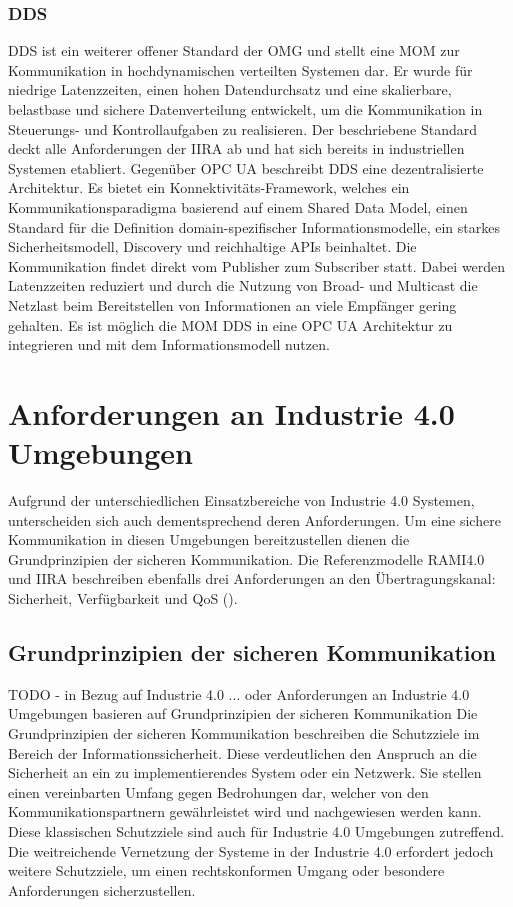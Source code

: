 \subsubsection{\ac{DDS}}
\ac{DDS} ist ein weiterer offener Standard der \ac{OMG} und stellt eine \ac{MOM} zur Kommunikation in hochdynamischen verteilten Systemen dar. Er wurde für niedrige Latenzzeiten, einen hohen Datendurchsatz und eine skalierbare, belastbase und sichere Datenverteilung entwickelt, um die Kommunikation in Steuerungs- und Kontrollaufgaben zu realisieren. Der beschriebene Standard deckt alle Anforderungen der \ac{IIRA} ab und hat sich bereits in industriellen Systemen etabliert. Gegenüber \ac{OPC UA} beschreibt \ac{DDS} eine dezentralisierte Architektur. Es bietet ein Konnektivitäts-Framework, welches ein Kommunikationsparadigma basierend auf einem Shared Data Model, einen Standard für die Definition domain-spezifischer Informationsmodelle, ein starkes Sicherheitsmodell, Discovery und reichhal­tige APIs beinhaltet. Die Kommunikation findet direkt vom Publisher zum Subscriber statt. Dabei werden Latenzzeiten reduziert und durch die Nutzung von Broad- und Multicast die Netzlast beim Bereitstellen von Informationen an viele Empfänger gering gehalten. Es ist möglich die \ac{MOM} \ac{DDS} in eine \ac{OPC UA} Architektur zu integrieren und mit dem Informationsmodell nutzen.

\section{Anforderungen an Industrie 4.0 Umgebungen}
Aufgrund der unterschiedlichen Einsatzbereiche von Industrie 4.0 Systemen, unterscheiden sich auch dementsprechend deren Anforderungen. Um eine sichere Kommunikation in diesen Umgebungen bereitzustellen dienen die Grundprinzipien der sicheren Kommunikation. Die Referenzmodelle \ac{RAMI4.0} und \ac{IIRA} beschreiben ebenfalls drei Anforderungen an den Übertragungskanal: Sicherheit, Verfügbarkeit und \ac{QoS} (\cite{BMWiNeCon2016}).

\subsection{Grundprinzipien der sicheren Kommunikation}
\label{Grundlagen:Grundprinzipien der sicheren Kommunikation}
TODO - in Bezug auf Industrie 4.0 ... oder Anforderungen an Industrie 4.0 Umgebungen basieren auf Grundprinzipien der sicheren Kommunikation
Die Grundprinzipien der sicheren Kommunikation beschreiben die Schutzziele im Bereich der Informationssicherheit. Diese verdeutlichen den Anspruch an die Sicherheit an ein zu implementierendes System oder ein Netzwerk. Sie stellen einen vereinbarten Umfang gegen Bedrohungen dar, welcher von den Kommunikationspartnern gewährleistet wird und nachgewiesen werden kann. Diese klassischen Schutzziele sind auch für Industrie 4.0 Umgebungen zutreffend. Die weitreichende Vernetzung der Systeme in der Industrie 4.0 erfordert jedoch weitere Schutzziele, um einen rechtskonformen Umgang oder besondere Anforderungen sicherzustellen.

